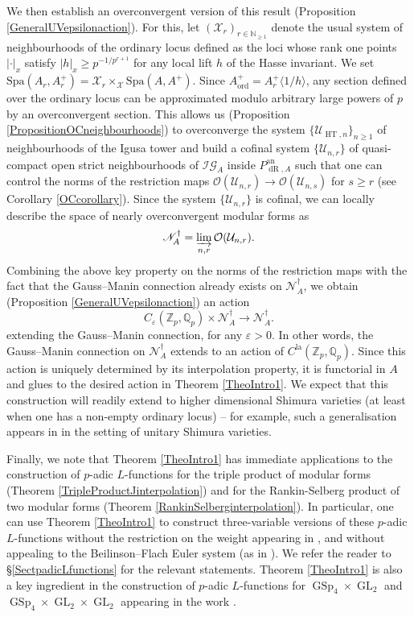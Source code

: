\documentclass[10pt, oneside]{amsart}
\numberwithin{equation}{subsection}
\theoremstyle{definition}
\theoremstyle{remark}
\newcommand{\mbb}[1]{\mathbb{#1}}
\newcommand{\opn}[1]{\operatorname{#1}}
\def\Q{\mathbb{Q}}
\def\Z{{\mathbb{Z}}}
\def\N{{\mathbb{N}}}
\def\Spa{\mathrm{Spa}}
\begin{document}
We then establish an overconvergent version of this result (Proposition \ref{GeneralUVepsilonaction}). For this, let $(\mathcal{X}_r)_{r \in \N_{\geq 1}}$ denote the usual system of neighbourhoods of the ordinary locus defined as the loci whose rank one points $| \cdot |_x$ satisfy $|h|_x \geq p^{-1/p^{r+1}}$ for any local lift $h$ of the Hasse invariant. We set $\Spa(A_{r}, A^+_r) = \mathcal{X}_{r} \times_\mathcal{X} \Spa(A, A^+)$. Since $A^+_{\opn{ord}} = A^+_{r}\langle 1/h \rangle$, any section defined over the ordinary locus can be approximated modulo arbitrary large powers of $p$ by an overconvergent section. This allows us (Proposition \ref{PropositionOCneighbourhoods}) to overconverge the system $\{ \mathcal{U}_{\opn{HT}, n} \}_{n \geq 1}$ of neighbourhoods of the Igusa tower and build a cofinal system $\{ \mathcal{U}_{n, r} \}$ of quasi-compact open strict neighbourhoods of $\mathcal{IG}_A$ inside $P_{\opn{dR}, A}^{\opn{an}}$ such that one can control the norms of the restriction maps $\mathcal{O}(\mathcal{U}_{n, r}) \to \mathcal{O}(\mathcal{U}_{n, s})$ for $s \geq r$ (see Corollary \ref{OCcorollary}). Since the system $\{ \mathcal{U}_{n, r} \}$ is cofinal, we can locally describe the space of nearly overconvergent modular forms as
\[ 
\mathscr{N}^{\dagger}_A = \varinjlim_{n, r} \mathcal{O}(\mathcal{U}_{n, r}). 
\]
Combining the above key property on the norms of the restriction maps with the fact that the Gauss--Manin connection already exists on $\mathscr{N}^{\dagger}_A$, we obtain (Proposition \ref{GeneralUVepsilonaction}) an action
\[ 
C_{\varepsilon}(\Z_p, \Q_p) \times \mathscr{N}^\dagger_A \to \mathscr{N}^\dagger_A.
\]
extending the Gauss--Manin connection, for any $\varepsilon > 0$. In other words, the Gauss--Manin connection on $\mathscr{N}^{\dagger}_A$ extends to an action of $C^{\opn{la}}(\mbb{Z}_p, \mbb{Q}_p)$. Since this action is uniquely determined by its interpolation property, it is functorial in $A$ and glues to the desired action in Theorem \ref{TheoIntro1}. We expect that this construction will readily extend to higher dimensional Shimura varieties (at least when one has a non-empty ordinary locus) -- for example, such a generalisation appears in \cite{UFJII} in the setting of unitary Shimura varieties.

Finally, we note that Theorem \ref{TheoIntro1} has immediate applications to the construction of $p$-adic $L$-functions for the triple product of modular forms (Theorem \ref{TripleProductJinterpolation}) and for the Rankin-Selberg product of two modular forms (Theorem \ref{RankinSelberginterpolation}). In particular, one can use Theorem \ref{TheoIntro1} to construct three-variable versions of these $p$-adic $L$-functions without the restriction on the weight appearing in \cite{AI_LLL}, and without appealing to the Beilinson--Flach Euler system (as in \cite{LoefflerRSNote}). We refer the reader to \S \ref{SectpadicLfunctions} for the relevant statements. Theorem \ref{TheoIntro1} is also a key ingredient in the construction of $p$-adic $L$-functions for $\opn{GSp}_4 \times \opn{GL}_2$ and $\opn{GSp}_4 \times \opn{GL}_2 \times \opn{GL}_2$ appearing in the work \cite{2024arXiv241104559G}.
\end{document}
